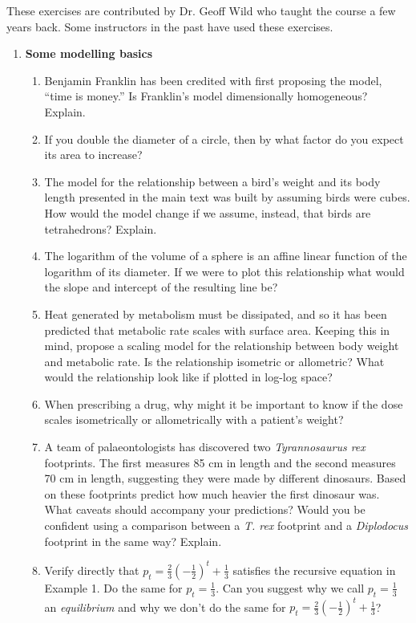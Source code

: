 \documentclass[11pt]{article}
\begin{document}
These exercises are contributed by Dr. Geoff Wild who taught the course a few years back. Some instructors in the past have used these exercises. 

\begin{enumerate}
  \item \textbf{Some modelling basics}
    \begin{enumerate}
      \item Benjamin Franklin has been credited with first proposing the model, ``time is money.'' Is Franklin's model dimensionally homogeneous? Explain.
      \item If you double the diameter of a circle, then by what factor do you expect its area to increase?
      \item The model for the relationship between a bird's weight and its body length presented in the main text was built by assuming birds were cubes. How would the model change if we assume, instead, that birds are tetrahedrons? Explain. 
      \item The logarithm of the volume of a sphere is an affine linear function of the logarithm of its diameter. If we were to plot this relationship what would the slope and intercept of the resulting line be? 
      \item Heat generated by metabolism must be dissipated, and so it has been predicted that metabolic rate scales with surface area.  Keeping this in mind, propose a scaling model for the relationship between body weight and metabolic rate. Is the relationship isometric or allometric?  What would the relationship look like if plotted in log-log space?
      \item When prescribing a drug, why might it be important to know if the dose scales isometrically or allometrically with a patient's weight?	
      \item A team of palaeontologists has discovered two {\it Tyrannosaurus rex} footprints. The first measures 85 cm in length and the second measures 70 cm in length, suggesting they were made by different dinosaurs. Based on these footprints predict how much heavier the first dinosaur was. What caveats should accompany your predictions? Would you be confident using a comparison between a {\it T. rex} footprint and a {\it Diplodocus} footprint in the same way? Explain. 
      \item Verify directly that $p_t = \frac{2}{3}\left(-\frac{1}{2}\right)^t + \frac{1}{3}$ satisfies the recursive equation in Example 1. Do the same for $p_t=\frac{1}{3}$. Can you suggest why we call $p_t = \frac{1}{3}$ an {\it equilibrium} and why we don't do the same for $p_t  = \frac{2}{3}\left(-\frac{1}{2}\right)^t + \frac{1}{3}$?

\end{enumerate}
\end{enumerate}
\end{document}
